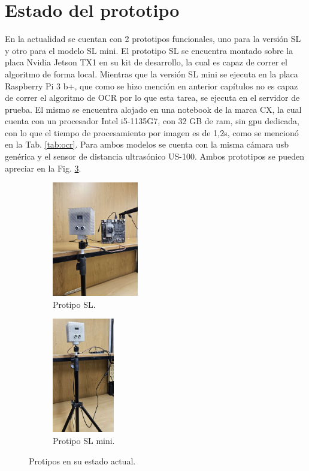 \section{Estado del prototipo}

En la actualidad se cuentan con 2 prototipos funcionales, uno para la versión SL y otro para el modelo SL mini.
El prototipo SL se encuentra montado sobre la placa Nvidia Jetson TX1 en su kit de desarrollo, la cual es capaz de correr el algoritmo de forma local.
Mientras que la versión SL mini se ejecuta en la placa Raspberry Pi 3 b+, que como se hizo mención en anterior capítulos no es capaz de correr el algoritmo de OCR por lo que esta tarea, se ejecuta en el servidor de prueba. El mismo se encuentra alojado en una notebook de la marca CX, la cual cuenta con un procesador Intel i5-1135G7, con 32 GB de ram, sin gpu dedicada, con lo que el tiempo de procesamiento por imagen es de 1,2s, como se mencionó en la Tab. \ref{tab:ocr}.
Para ambos modelos se cuenta con la misma cámara usb genérica y el sensor de distancia ultrasónico US-100.
Ambos prototipos se pueden apreciar en la Fig. \ref{fig:prototipos}.
\begin{figure}[bth]
    \begin{subfigure}{.45\textwidth}
        \centering
        \includegraphics[height=5cm]{imgs/prototipo-sl.jpeg}
        \caption{Protipo SL.}
        \label{fig:prot-sl}
    \end{subfigure}
    \begin{subfigure}{.45\textwidth}
        \centering
        \includegraphics[height=5cm]{imgs/prototipo-sl-mini.jpeg}
        \caption{Protipo SL mini.}
        \label{fig:prot-sl-mini}
    \end{subfigure}
    \caption{Protipos en su estado actual.}
    \label{fig:prototipos}
\end{figure}


